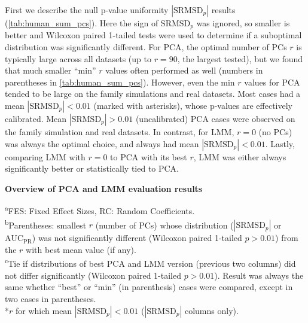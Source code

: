 \documentclass[11pt]{article}
\newcommand{\rmsd}{\text{SRMSD}_p}
\newcommand{\auc}{\text{AUC}_\text{PR}}
\begin{document}
First we describe the null p-value uniformity $|\rmsd|$ results (\cref{tab:human_sum_pcs}).
Here the sign of $\rmsd$ was ignored, so smaller is better and Wilcoxon paired 1-tailed tests were used to determine if a suboptimal distribution was significantly different.
For PCA, the optimal number of PCs $r$ is typically large across all datasets (up to $r=90$, the largest tested), but we found that much smaller ``min'' $r$ values often performed as well (numbers in parentheses in \cref{tab:human_sum_pcs}).
However, even the min $r$ values for PCA tended to be large on the family simulations and real datasets.
Most cases had a mean $|\rmsd| < 0.01$ (marked with asterisks), whose p-values are effectively calibrated.
Mean $|\rmsd| > 0.01$ (uncalibrated) PCA cases were observed on the family simulation and real datasets.
In contrast, for LMM, $r=0$ (no PCs) was always the optimal choice, and always had mean $|\rmsd| < 0.01$.
Lastly, comparing LMM with $r=0$ to PCA with its best $r$, LMM was either always significantly better or statistically tied to PCA.

\begin{table}[hb!]
  \centering
  \caption{
    \textbf{Overview of PCA and LMM evaluation results}
  }
  \label{tab:human_sum_pcs}
  \csvreader[
  tabular = lc|ccc|ccc,
  separator = tab,
  table head = 
  \toprule & Metric: & \multicolumn{3}{c|}{$|\rmsd|$} & \multicolumn{3}{c}{$\auc$} \\
  \midrule & & \multicolumn{2}{c}{Best (min\textsuperscript{b}) PCs} & & \multicolumn{2}{c}{Best (min\textsuperscript{b}) PCs} & \\
  Dataset & {Trait model\textsuperscript{a}} & PCA & LMM & {Best\textsuperscript{c}} & PCA & LMM & {Best\textsuperscript{c}} \\\midrule,
  late after last line = \\\bottomrule
  ]{../data/stats.txt}{}{\csvlinetotablerow}
  \begin{flushleft}
    \textsuperscript{a}FES: Fixed Effect Sizes, RC: Random Coefficients.\\
    \textsuperscript{b}Parentheses: smallest $r$ (number of PCs) whose distribution ($|\rmsd|$ or $\auc$) was not significantly different (Wilcoxon paired 1-tailed $p > 0.01$) from the $r$ with best mean value (if any). \\
    \textsuperscript{c}Tie if distributions of best PCA and LMM version (previous two columns) did not differ significantly (Wilcoxon paired 1-tailed $p > 0.01$).
    Result was always the same whether ``best'' or ``min'' (in parenthesis) cases were compared, except in two cases in parentheses.\\
    *$r$ for which mean $|\rmsd| < 0.01$ ($|\rmsd|$ columns only).
  \end{flushleft}
\end{table}
\end{document}
